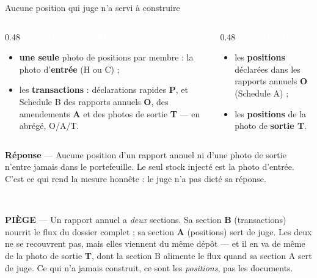 \documentclass[11pt,aspectratio=169]{beamer}
\newcommand{\badge}[2]{\colorbox{#1}{\textcolor{white}{\footnotesize\textbf{#2}}}}
\newcommand{\repband}[1]{%
  \colorbox{okgreen!12}{\parbox{\dimexpr\textwidth-10pt}{\scriptsize
    \textbf{\textcolor{okgreen}{Réponse}}\; --- #1}}}
\newcommand{\piege}[1]{%
  \colorbox{warnorange!12}{\parbox{\dimexpr\linewidth-8pt}{\scriptsize
    \textbf{\textcolor{warnorange}{PIÈGE}}\; --- #1}}}
\begin{document}
\begin{frame}{Aucune position qui juge n'a servi à construire}
  \small
  \begin{columns}[T]
    \begin{column}{0.48\textwidth}
      \badge{okgreen}{CE QUI CONSTRUIT}\\[1.5mm]
      \begin{itemize}\itemsep2pt
        \item \textbf{une seule} photo de positions par membre : la photo d'\textbf{entrée} (H ou C) ;
        \item les \textbf{transactions} : déclarations rapides \textbf{P}, et Schedule B des
              rapports annuels \textbf{O}, des amendements \textbf{A} et des photos de sortie
              \textbf{T} --- en abrégé, O/A/T.
      \end{itemize}
    \end{column}
    \begin{column}{0.48\textwidth}
      \badge{helec}{CE QUI JUGE}\\[1.5mm]
      \begin{itemize}\itemsep2pt
        \item les \textbf{positions} déclarées dans les rapports annuels \textbf{O} (Schedule A) ;
        \item les \textbf{positions} de la photo de \textbf{sortie T}.
      \end{itemize}
    \end{column}
  \end{columns}
  \vspace{3mm}
  \centering
  \repband{Aucune position d'un rapport annuel ni d'une photo de sortie n'entre jamais dans le
  portefeuille. Le seul stock injecté est la photo d'entrée. C'est ce qui rend la mesure honnête :
  le juge n'a pas dicté sa réponse.}\\[2mm]
  \raggedright
  \piege{Un rapport annuel a \emph{deux} sections. Sa section \textbf{B} (transactions) nourrit le
  flux du dossier complet ; sa section \textbf{A} (positions) sert de juge. Les deux ne se
  recouvrent pas, mais elles viennent du même dépôt --- et il en va de même de la photo de sortie
  \textbf{T}, dont la section B alimente le flux quand sa section A sert de juge. Ce qui n'a jamais
  construit, ce sont les \emph{positions}, pas les documents.}
\end{frame}
\end{document}

